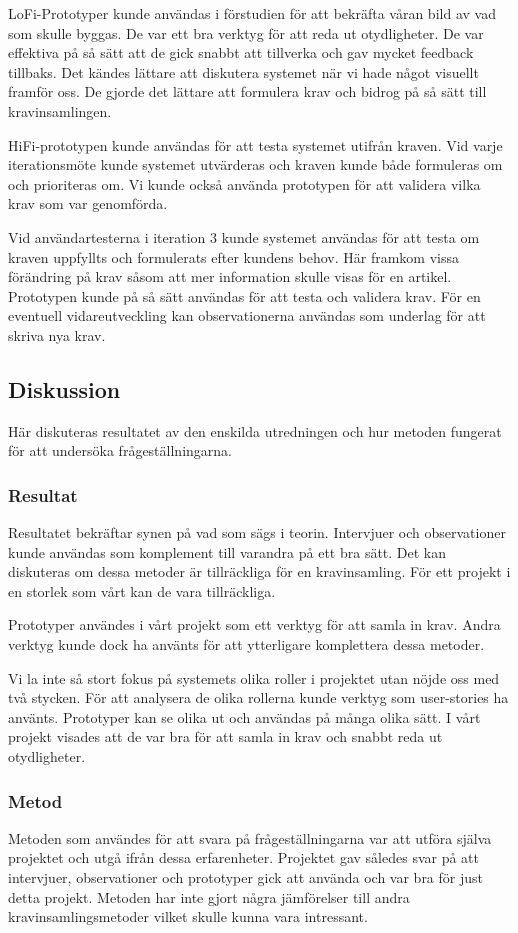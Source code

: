 LoFi-Prototyper kunde användas i förstudien för att bekräfta våran bild av vad som skulle byggas. De var ett bra verktyg för att reda ut otydligheter. De var effektiva på så sätt att de gick snabbt att tillverka och gav mycket feedback tillbaks. Det kändes lättare att diskutera systemet när vi hade något visuellt framför oss. De gjorde det lättare att formulera krav och bidrog på så sätt till kravinsamlingen.

HiFi-prototypen kunde användas för att testa systemet utifrån kraven. Vid varje iterationsmöte kunde systemet utvärderas och kraven kunde både formuleras om och prioriteras om. Vi kunde också använda prototypen för att validera vilka krav som var genomförda. 
 
Vid användartesterna i iteration 3 kunde systemet användas för att testa om kraven uppfyllts och formulerats efter kundens behov. Här framkom vissa förändring på krav såsom att mer information skulle visas för en artikel. Prototypen kunde på så sätt användas för att testa och validera krav. För en eventuell vidareutveckling kan observationerna användas som underlag för att skriva nya krav.

\subsection{Diskussion}
Här diskuteras resultatet av den enskilda utredningen och hur metoden fungerat för att undersöka frågeställningarna.
\subsubsection{Resultat}
Resultatet bekräftar synen på vad som sägs i teorin. Intervjuer och observationer kunde användas som komplement till varandra på ett bra sätt. Det kan diskuteras om dessa metoder är tillräckliga för en kravinsamling. För ett projekt i en storlek som vårt kan de vara tillräckliga. 

Prototyper användes i vårt projekt som ett verktyg för att samla in krav. Andra verktyg kunde dock ha använts för att ytterligare komplettera dessa metoder. 

Vi la inte så stort fokus på systemets olika roller i projektet utan nöjde oss med två stycken. För att analysera de olika rollerna kunde verktyg som user-stories ha använts.
Prototyper kan se olika ut och användas på många olika sätt. I vårt projekt visades att de var bra för att samla in krav och snabbt reda ut otydligheter. 
\subsubsection{Metod}
Metoden som användes för att svara på frågeställningarna var att utföra själva projektet och utgå ifrån dessa erfarenheter. Projektet gav således svar på att intervjuer, observationer och prototyper gick att använda och var bra för just detta projekt. Metoden har inte gjort några jämförelser till andra kravinsamlingsmetoder vilket skulle kunna vara intressant. 

